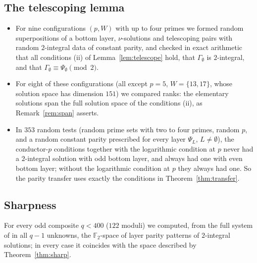 \documentclass[11pt]{amsart}
\theoremstyle{definition}
\theoremstyle{remark}
\newcommand{\F}{\mathbb F}
\numberwithin{equation}{section}
\begin{document}
\subsection{The telescoping lemma}
\begin{itemize}
\item For nine configurations $(p,W)$ with up to four primes we formed random superpositions of a bottom layer, $\nu$-solutions and telescoping pairs with random $2$-integral data of constant parity, and checked in exact arithmetic that all conditions (ii) of Lemma~\ref{lem:telescope} hold, that $\Gamma_\emptyset$ is $2$-integral, and that $\Gamma_\emptyset\equiv\Psi_\emptyset\pmod2$.
\item For eight of these configurations (all except $p=5$, $W=\{13,17\}$, whose solution space has dimension $151$) we compared ranks: the elementary solutions span the full solution space of the conditions (ii), as Remark~\ref{rem:span} asserts.
\item In $353$ random tests (random prime sets with two to four primes, random $p$, and a random constant parity prescribed for every layer $\Psi_L$, $L\neq\emptyset$), the conductor-$p$ conditions together with the logarithmic condition at $p$ never had a $2$-integral solution with odd bottom layer, and always had one with even bottom layer; without the logarithmic condition at $p$ they always had one. So the parity transfer uses exactly the conditions in Theorem~\ref{thm:transfer}.
\end{itemize}

\subsection{Sharpness}
For every odd composite $q<400$ ($122$ moduli) we computed, from the full system of \cite[Thm.~2.2]{Kei26} in all $q-1$ unknowns, the $\F_2$-space of layer parity patterns of $2$-integral solutions; in every case it coincides with the space described by Theorem~\ref{thm:sharp}.
\end{document}

